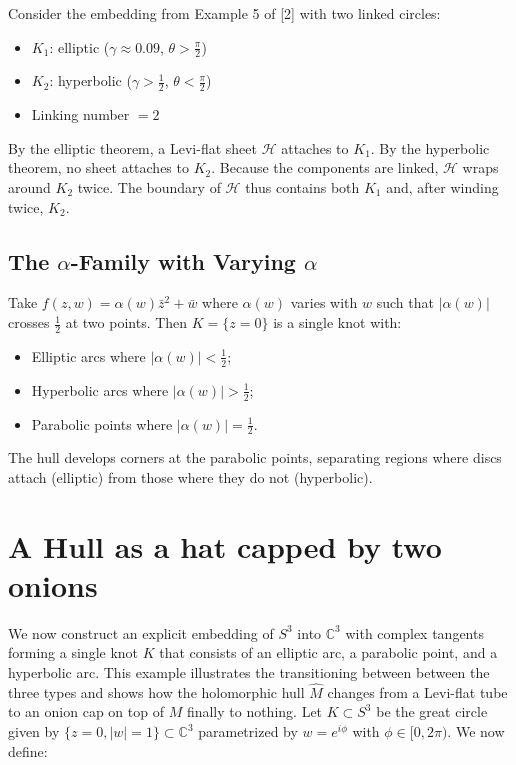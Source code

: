 \documentclass{amsart}
\begin{document}
Consider the embedding from Example 5 of [2] with two linked circles:
\begin{itemize}
\item $K_1$: elliptic ($\gamma \approx 0.09$, $\theta > \frac{\pi}{2}$)
\item $K_2$: hyperbolic ($\gamma > \frac{1}{2}$, $\theta < \frac{\pi}{2}$)
\item Linking number $= 2$
\end{itemize}
By the elliptic theorem, a Levi-flat sheet $\mathcal{H}$ attaches to $K_1$. By the hyperbolic theorem, no sheet attaches to $K_2$. Because the components are linked, $\mathcal{H}$ wraps around $K_2$ twice. The boundary of $\mathcal{H}$ thus contains both $K_1$ and, after winding twice, $K_2$.

\subsection{The $\alpha$-Family with Varying $\alpha$}

Take $f(z,w) = \alpha(w)\bar{z}^2 + \bar{w}$ where $\alpha(w)$ varies with $w$ such that $|\alpha(w)|$ crosses $\frac{1}{2}$ at two points. Then $K = \{z=0\}$ is a single knot with:
\begin{itemize}
\item Elliptic arcs where $|\alpha(w)| < \frac{1}{2}$;
\item Hyperbolic arcs where $|\alpha(w)| > \frac{1}{2}$;
\item Parabolic points where $|\alpha(w)| = \frac{1}{2}$.
\end{itemize}
The hull develops corners at the parabolic points, separating regions where discs attach (elliptic) from those where they do not (hyperbolic).









\section{A Hull as a hat capped by two onions} 
We now construct an explicit embedding of $S^3$ into $\mathbb{C}^3$ with complex tangents forming a single knot $K$ that consists of an elliptic arc, a parabolic point, and a hyperbolic arc. This example illustrates the transitioning between between the three types and shows how the holomorphic hull $\widehat{M}$ changes from a Levi-flat tube to an onion cap on top of $M$ finally to nothing. Let $K \subset S^3$ be the great circle given by $\{z = 0, |w| = 1 \} \subset \mathbb{C}^3$ parametrized by $w = e^{i\phi}$ with $\phi \in [0, 2\pi)$.  We now define:
\end{document}
